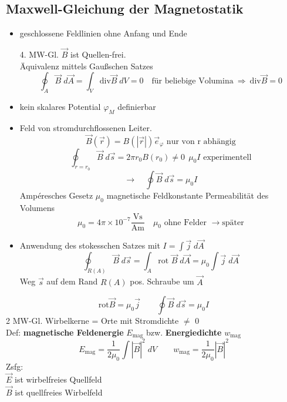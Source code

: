\documentclass[titlepage,12pt,a4paper,ngerman]{report}
\newcommand{\tx}[1]{\textrm{#1}}
\begin{document}
\subsection{Maxwell-Gleichung der Magnetostatik}
\begin{itemize}
	\item geschlossene Feldlinien ohne Anfang und Ende\\
	\begin{center}
		\fbox{
			$\begin{array}{c}
			\tx{div } \vec{B}=0 \\
			\Phi_M = \oint_A \vec{B}\; d \vec{A}
			\end{array}$
		}
	\end{center}
	4. MW-Gl. $\vec{B}$ ist Quellen-frei.\\[5pt]
	Äquivalenz mittels Gaußschen Satzes
	$$\oint_A \vec{B}\; d \vec{A} = \int_V \tx{div} \vec{B}\; dV =0 \quad \tx{für beliebige Volumina}\ \Rightarrow \ \tx{div} \vec{B} =0$$
	\item kein skalares Potential $\varphi_M$ definierbar
	\item Feld von stromdurchflossenen Leiter. 
	$$\vec{B}(\vec{r})=B(|\vec{r}|) \vec{e}_\varphi \tx{ nur von r abhängig}$$
	$$\oint_{r=r_0}\vec{B}\;d\vec{s} = 2 \pi r_0 B(r_0) \neq 0 \ \  \mu_0 I \tx{ experimentell}$$
	$$\boxed{ \rightarrow \quad \oint\vec{B}\; d\vec{s}=\mu_0 I}$$ Ampéresches Gesetz $\mu_0$ magnetische Feldkonstante Permeabilität des Volumens
	$$\mu_0 = 4 \pi \times 10^{-7} \frac{\tx{Vs}}{\tx{Am}} \quad \mu_0 \tx{ ohne Felder } \rightarrow \tx{später}$$
	\item Anwendung des stokesschen Satzes mit $I= \int \vec{j} \; d \vec{A}$
	$$\oint_{R(A)}\vec{B} \; d\vec{s} = \int_A \tx{rot }\vec{B} \; d\vec{A} = \mu_0 \int \vec{j} \; d\vec{A}$$ 
	Weg $ \vec{s} $ auf dem Rand $ R(A) $ pos. Schraube um $ \vec{A} $
\end{itemize}
$$\boxed{\tx{rot} \vec{B} = \mu _0 \vec{j} \qquad \oint \vec{B} \; d \vec{s} = \mu _0 I}$$
2 MW-Gl. Wirbelkerne = Orte mit Stromdichte $\neq$ 0\\[5pt]
Def: \textbf{magnetische Feldenergie} $ E_{\tx{mag}} $ bzw. \textbf{Energiedichte} $ w_{\tx{mag}} $ 
$$ E_{\tx{mag}} = \frac{1}{2 \mu _0} \int|\vec{B}|^2 \; dV \qquad  w_{\tx{mag}} = \frac{1}{2 \mu_0} |\vec{B}|^2$$
Zsfg:\\
$ \vec{E} $ ist wirbelfreies Quellfeld\\
$ \vec{B} $ ist quellfreies Wirbelfeld
\end{document}
